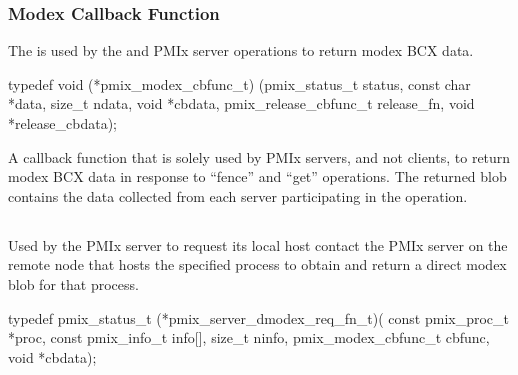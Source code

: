 \subsubsection{Modex Callback Function}

\summary

The  is used by the  and  PMIx server operations to return modex \ac{BCX} data.

\cspecificstart
\begin{codepar}
typedef void (*pmix_modex_cbfunc_t)
    (pmix_status_t status,
     const char *data, size_t ndata,
     void *cbdata,
     pmix_release_cbfunc_t release_fn,
     void *release_cbdata);
\end{codepar}
\cspecificend

\begin{arglist}
\end{arglist}

\descr

A callback function that is solely used by PMIx servers, and not clients, to return modex \ac{BCX} data in response to ``fence'' and ``get'' operations.
The returned blob contains the data collected from each server participating in the operation.


\subsection{}

\summary

Used by the PMIx server to request its local host contact the \ac{PMIx} server on the remote node that hosts the specified process to obtain and return a direct modex blob for that process.

\format

\cspecificstart
\begin{codepar}
typedef pmix_status_t (*pmix_server_dmodex_req_fn_t)(
                             const pmix_proc_t *proc,
                             const pmix_info_t info[],
                             size_t ninfo,
                             pmix_modex_cbfunc_t cbfunc,
                             void *cbdata);
\end{codepar}
\cspecificend


